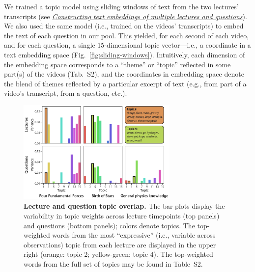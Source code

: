 \documentclass[10pt]{article}
\newcommand{\topics}{S2}
\begin{document}
We trained a topic model \citep{BleiEtal03} using sliding windows of text from the two
lectures' transcripts (see \hyperref[subsec:topic-modeling]{\textit{Constructing text embeddings of multiple
lectures and questions}}). We also used the same model (i.e., trained on the
videos' transcripts) to embed the text of each question in our pool. This
yielded, for each second of each video, and for each question, a single
15-dimensional topic vector---i.e., a coordinate in a text embedding space
(Fig.~\ref{fig:sliding-windows}). Intuitively, each dimension of the embedding
space corresponds to a ``theme'' or ``topic'' reflected in some part(s) of the
videos (Tab.~\topics), and the coordinates in embedding space denote the blend
of themes reflected by a particular excerpt of text (e.g., from part of a
video's transcript, from a question, etc.).

\begin{figure}[tp]
    \centering
    \includegraphics[width=0.7\textwidth]{figs/active-topics}

\caption{\textbf{Lecture and question topic overlap.} The bar plots display the
variability in topic weights across lecture timepoints (top panels) and
questions (bottom panels); colors denote topics. The top-weighted words from
the most ``expressive'' (i.e., variable across observations) topic from each
lecture are displayed in the upper right (orange: topic 2; yellow-green: topic
4). The top-weighted words from the full set of topics may be found in
Table~\topics.}

    \label{fig:topics}
\end{figure}
\end{document}
